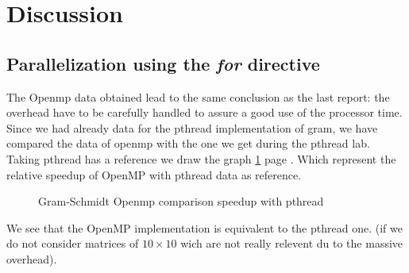 \section{Discussion}

\subsection{Parallelization using the \textit{for} directive}

The Openmp data obtained lead to the same conclusion as the last report: the overhead have to be carefully handled to assure a good use of the processor time.\\

Since we had already data for the pthread implementation of gram, we have compared the data of openmp with the one we get during the pthread lab. Taking pthread has a reference we draw the graph \ref{fig:gram_pthread} page \pageref{fig:gram_pthread}. Which represent the relative speedup of OpenMP with pthread data as reference.

\begin{figure}[ht]
  \begin{center}
  \end{center}
  \caption{Gram-Schmidt Openmp comparison speedup with pthread}
  \label{fig:gram_pthread}
\end{figure} 

We see that the OpenMP implementation is equivalent to the pthread one.
(if we do not consider matrices of $10\times 10$ wich are not really relevent du to the massive overhead).
